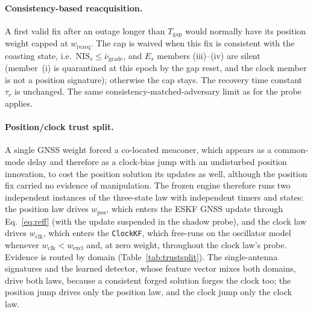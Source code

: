 \documentclass[journal]{IEEEtran}
\begin{document}
\paragraph{Consistency-based reacquisition.}
A first valid fix after an outage longer than $T_{\mathrm{gap}}$ would normally have its position weight capped
at $w_{\mathrm{reacq}}$. The cap is waived when this fix is consistent with the coasting state, i.e.\
$\mathrm{NIS}_s \le \bar\nu_{\mathrm{grade}}$, and $E_s$ members (iii)--(iv) are silent (member~(i) is
quarantined at this epoch by the gap reset, and the clock member is not a position signature); otherwise the cap
stays. The recovery time constant $\tau_r$ is unchanged. The same consistency-matched-adversary limit as for the
probe applies.

\paragraph{Position/clock trust split.}
A single GNSS weight forced a co-located meaconer, which appears as a common-mode delay and therefore as a
clock-bias jump with an undisturbed position innovation, to cost the position solution its updates as well,
although the position fix carried no evidence of manipulation. The frozen engine therefore runs two independent
instances of the three-state law with independent timers and states: the position law drives $w_{\mathrm{pos}}$,
which enters the ESKF GNSS update through Eq.~\eqref{eq:reff} (with the update suspended in the shadow probe), and the
clock law drives $w_{\mathrm{clk}}$, which enters the \texttt{ClockKF}, which free-runs on the oscillator model
whenever $w_{\mathrm{clk}} < w_{\mathrm{excl}}$ and, at zero weight, throughout the clock law's probe.
Evidence is routed by domain (Table~\ref{tab:trustsplit}). The single-antenna signatures and the learned
detector, whose feature vector mixes both domains, drive both laws, because a consistent forged solution
forges the clock too; the position jump drives only the position law, and the clock jump only the clock law.
\end{document}
